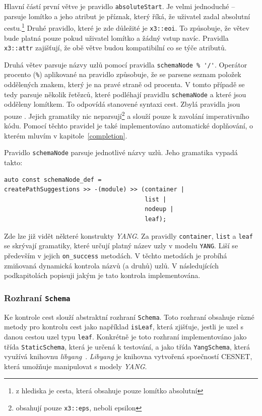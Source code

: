 \documentclass[thesis=B,czech,hidelinks]{FITthesis}[2019/03/06]
\begin{document}
Hlavní částí první větve je pravidlo \texttt{absoluteStart}. Je velmi jednoduché -- parsuje lomítko a jeho atribut je příznak, který říká, že uživatel zadal absolutní cestu.\footnote{z hlediska  je cesta, která obsahuje pouze lomítko absolutní} Druhé pravidlo, které je zde důležité je \texttt{x3::eoi}. To způsobuje, že větev bude platná pouze pokud uživatel lomítko a žádný vstup navíc. Pravidla \texttt{x3::attr} zajišťují, že obě větve budou kompatibilní co se týče atributů.

Druhá větev parsuje názvy uzlů pomocí pravidla \verb¨schemaNode % '/'¨. Operátor procento (\texttt{\%}) aplikované na pravidlo způsobuje, že se parsene seznam položek oddělených znakem, který je na pravé straně od procenta. V tomto případě se tedy parsuje několik řetězců, které podléhají pravidlu \texttt{schemaNode} a které jsou odděleny lomítkem. To odpovídá stanovené syntaxi cest. Zbylá pravidla jsou pouze . Jejich gramatiky nic neparsují\footnote{obsahují pouze \texttt{x3::eps}, neboli epsilon} a slouží pouze k zavolání imperativního kódu. Pomocí těchto pravidel je také implementováno automatické doplňování, o kterém mluvím v kapitole~\ref{completion}.

Pravidlo \texttt{schemaNode} parsuje jednotlivé názvy uzlů. Jeho gramatika vypadá takto:
\begin{verbatim}
auto const schemaNode_def =
createPathSuggestions >> -(module) >> (container |
                                       list |
                                       nodeup |
                                       leaf);
\end{verbatim}
Zde lze již vidět některé konstrukty \textit{YANG}. Za pravidly \texttt{container}, \texttt{list} a \texttt{leaf} se skrývají gramatiky, které určují platný název uzly v modelu \texttt{YANG}. Liší se především v jejich \verb¨on_success¨ metodách. V těchto metodách je probíhá zmiňovaná dynamická kontrola názvů (a druhů) uzlů. V následujících podkapitolách popisuji jakým je tato kontrola implementována.

\subsubsection{Rozhraní \texttt{Schema}}
Ke kontrole cest slouží abstraktní rozhraní \texttt{Schema}. Toto rozhraní obsahuje různé metody pro kontrolu cest jako například \texttt{isLeaf}, která zjišťuje, jestli je uzel s danou cestou uzel typu \texttt{leaf}. Konkrétně je toto rozhraní implementováno jako třída \texttt{StaticSchema}, která je určená k testování, a jako třída \texttt{YangSchema}, která využívá knihovnu \textit{libyang}~\cite{libyang}. \textit{Libyang} je knihovna vytvořená spoečností CESNET, která umožňuje manipulovat s modely \textit{YANG}.
\end{document}
